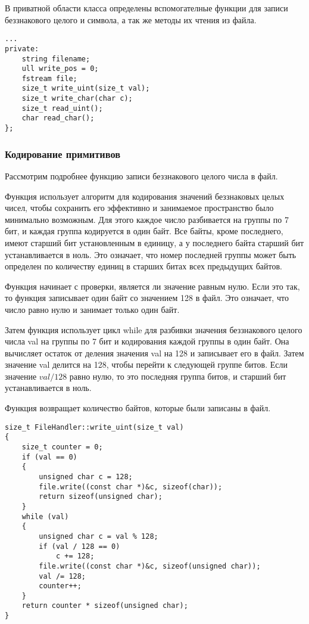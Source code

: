 \documentclass[14pt, russian]{scrartcl}
\begin{document}
В приватной области класса определены вспомогателные функции для записи беззнакового целого и символа, а так же методы их чтения из файла.
\begin{verbatim}
...
private:
	string filename;
	ull write_pos = 0;
	fstream file;
	size_t write_uint(size_t val);
	size_t write_char(char c);
	size_t read_uint();
	char read_char();
};
\end{verbatim}

\subsubsection{Кодирование примитивов}

Рассмотрим подробнее функцию записи беззнакового целого числа в файл. 

Функция использует алгоритм для кодирования значений беззнаковых целых чисел, чтобы сохранить его эффективно и занимаемое пространство было минимально возможным. Для этого каждое число разбивается на группы по 7 бит, и каждая группа кодируется в один байт. Все байты, кроме последнего, имеют старший бит установленным в единицу, а у последнего байта старший бит устанавливается в ноль. Это означает, что номер последней группы может быть определен по количеству единиц в старших битах всех предыдущих байтов.

Функция начинает с проверки, является ли значение равным нулю. Если это так, то функция записывает один байт со значением 128 в файл. Это означает, что число равно нулю и занимает только один байт.

Затем функция использует цикл while для разбивки значения беззнакового целого числа val на группы по 7 бит и кодирования каждой группы в один байт. Она вычисляет остаток от деления значения val на 128 и записывает его в файл. Затем значение val делится на 128, чтобы перейти к следующей группе битов. Если значение $val / 128$ равно нулю, то это последняя группа битов, и старший бит устанавливается в ноль.

Функция возвращает количество байтов, которые были записаны в файл.


\begin{verbatim}
size_t FileHandler::write_uint(size_t val)
{
	size_t counter = 0;
	if (val == 0)
	{
		unsigned char c = 128;
		file.write((const char *)&c, sizeof(char));
		return sizeof(unsigned char);
	}
	while (val)
	{
		unsigned char c = val % 128;
		if (val / 128 == 0)
			c += 128;
		file.write((const char *)&c, sizeof(unsigned char));
		val /= 128;
		counter++;
	}
	return counter * sizeof(unsigned char);
}
\end{verbatim}
\end{document}
